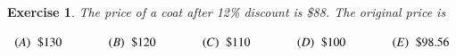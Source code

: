 \documentclass[12pt]{amsart}
\newtheorem{exer}{Exercise}
\begin{document}
\begin{exer}
The price of a coat after 12\% discount is \$88. The original
price is

$
\begin{array}{ccccc}
  (A)\hspace{0.2cm} \$130 \hspace{1cm} & (B)\hspace{0.2cm}
   \$120 \hspace{1cm} & (C)\hspace{0.2cm} \$110 \hspace{1cm} &
(D)\hspace{0.2cm} \$100 \hspace{1cm} &
   (E)\hspace{0.2cm} \$98.56 \\
\end{array}
$
\end{exer}
\end{document}
